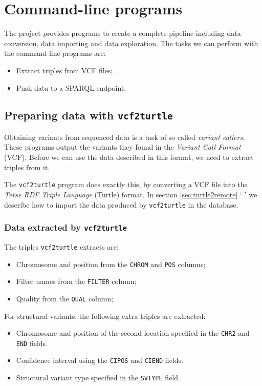 \documentclass[11pt,a4paper]{book}
\begin{document}
\chapter{Command-line programs}

  The project provides programs to create a complete pipeline including
  data conversion, data importing and data exploration.  The tasks we can
  perform with the command-line programs are:
  \begin{itemize}
    \item Extract triples from VCF files;
    \item Push data to a SPARQL endpoint.
  \end{itemize}

\section{Preparing data with \texttt{vcf2turtle}}

  Obtaining variants from sequenced data is a task of so called
  \emph{variant callers}.  These programs output the variants they found in
  the \emph{Variant Call Format} (VCF).  Before we can use the data described
  in this format, we need to extract triples from it.

  The \texttt{vcf2turtle} program does exactly this, by converting a VCF file
  into the \emph{Terse RDF Triple Language} (Turtle) format.  In section
  \ref{sec:turtle2remote} \textcolor{LinkGray}{`}%
  \textcolor{LinkGray}{'} we describe how to import the data produced by
  \texttt{vcf2turtle} in the database.

\subsection{Data extracted by \texttt{vcf2turtle}}

  The triples \texttt{vcf2turtle} extracts are:
  \begin{itemize}
    \item Chromosome and position from the \texttt{CHROM} and \texttt{POS}
      columns;
    \item Filter names from the \texttt{FILTER} column;
    \item Quality from the \texttt{QUAL} column;
  \end{itemize}

  For structural variants, the following extra triples are extracted:
  \begin{itemize}
    \item Chromosome and position of the second location specified in the
      \texttt{CHR2} and \texttt{END} fields.
    \item Confidence interval using the \texttt{CIPOS} and \texttt{CIEND}
      fields.
    \item Structural variant type specified in the \texttt{SVTYPE} field.
  \end{itemize}
\end{document}
